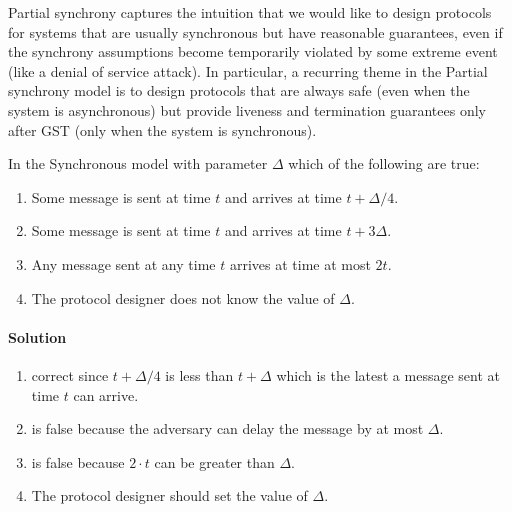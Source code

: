 Partial synchrony captures the intuition that we would like to design protocols for 
systems that are usually synchronous but have reasonable guarantees, 
even if the synchrony assumptions become temporarily violated by some extreme event
(like a denial of service attack). In particular, a recurring theme in the Partial
synchrony model is to design protocols that are always safe (even when the system
is asynchronous) but provide liveness and termination guarantees only
after GST (only when the system is synchronous).


\begin{xca}
    In the Synchronous model with parameter $\Delta$ which of the following are true:
    \begin{enumerate}
        \item Some message is sent at time $t$ and arrives at time $t+\Delta/4$.
        \item Some message is sent at time $t$ and arrives at time $t+3\Delta$.
        \item Any message sent at any time $t$ arrives at time at most $2t$.
        \item The protocol designer does not know the value of $\Delta$.
    \end{enumerate}


\paragraph{Solution}
        \begin{enumerate}
            \item correct since $t+ \Delta/4$ is less than $t+ \Delta$ which is
            the latest a message sent at time $t$ can arrive.
            \item is false because the adversary can delay the message by at most $\Delta$.
            \item is false because $2\cdot t$ can be greater than $\Delta$.
            \item The protocol designer should set the value of $\Delta$.
        \end{enumerate}

\end{xca}

